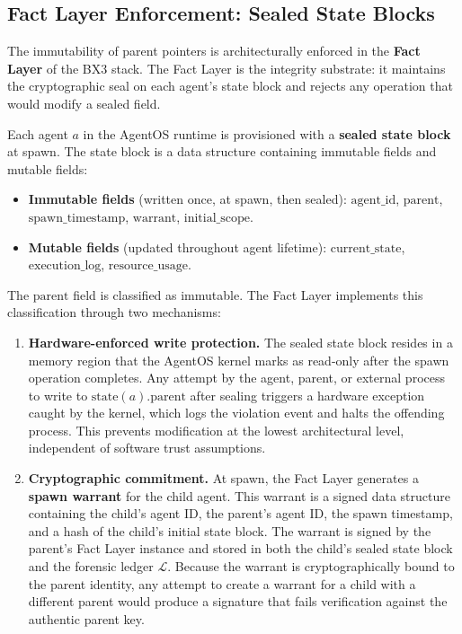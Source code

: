 \subsection{Fact Layer Enforcement: Sealed State Blocks}\label{sec:fact-layer-enforcement}

The immutability of parent pointers is architecturally enforced in the \textbf{Fact Layer} of the BX3 stack. The Fact Layer is the integrity substrate: it maintains the cryptographic seal on each agent's state block and rejects any operation that would modify a sealed field.

Each agent $a$ in the AgentOS runtime is provisioned with a \textbf{sealed state block} at spawn. The state block is a data structure containing immutable fields and mutable fields:

\begin{itemize}
    \item \textbf{Immutable fields} (written once, at spawn, then sealed): $\text{agent\_id}$, $\text{parent}$, $\text{spawn\_timestamp}$, $\text{warrant}$, $\text{initial\_scope}$.
    \item \textbf{Mutable fields} (updated throughout agent lifetime): $\text{current\_state}$, $\text{execution\_log}$, $\text{resource\_usage}$.
\end{itemize}

The $\text{parent}$ field is classified as immutable. The Fact Layer implements this classification through two mechanisms:

\begin{enumerate}
    \item \textbf{Hardware-enforced write protection.} The sealed state block resides in a memory region that the AgentOS kernel marks as read-only after the spawn operation completes. Any attempt by the agent, parent, or external process to write to $\text{state}(a).\text{parent}$ after sealing triggers a hardware exception caught by the kernel, which logs the violation event and halts the offending process. This prevents modification at the lowest architectural level, independent of software trust assumptions.
    \item \textbf{Cryptographic commitment.} At spawn, the Fact Layer generates a \textbf{spawn warrant} for the child agent. This warrant is a signed data structure containing the child's agent ID, the parent's agent ID, the spawn timestamp, and a hash of the child's initial state block. The warrant is signed by the parent's Fact Layer instance and stored in both the child's sealed state block and the forensic ledger $\mathcal{L}$. Because the warrant is cryptographically bound to the parent identity, any attempt to create a warrant for a child with a different parent would produce a signature that fails verification against the authentic parent key.
\end{enumerate}

